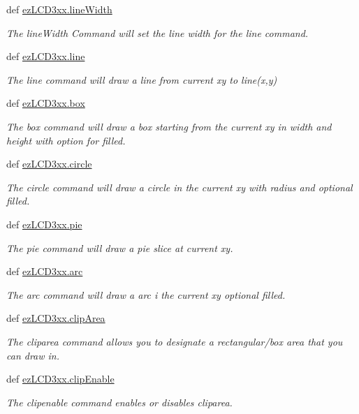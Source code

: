 \begin{DoxyCompactItemize}
def \hyperlink{group___drawing_ga87b2625e7e4ffa927b4471003f8c6e70}{ez\-L\-C\-D3xx.\-line\-Width}
\begin{DoxyCompactList}\small\item\em The line\-Width Command will set the line width for the line command. \end{DoxyCompactList}\item 
def \hyperlink{group___drawing_gae70c22a0a810a70a0dd6d32c9fd7c066}{ez\-L\-C\-D3xx.\-line}
\begin{DoxyCompactList}\small\item\em The line command will draw a line from current xy to line(x,y) \end{DoxyCompactList}\item 
def \hyperlink{group___drawing_ga63bb01e1f5ef0fe2ae2acec0ed90e5bd}{ez\-L\-C\-D3xx.\-box}
\begin{DoxyCompactList}\small\item\em The box command will draw a box starting from the current xy in width and height with option for filled. \end{DoxyCompactList}\item 
def \hyperlink{group___drawing_gabfcfb31f2d88c7397332abcc6b324c7c}{ez\-L\-C\-D3xx.\-circle}
\begin{DoxyCompactList}\small\item\em The circle command will draw a circle in the current xy with radius and optional filled. \end{DoxyCompactList}\item 
def \hyperlink{group___drawing_ga12fb93d2d6f7ce3f08ad988c09624d57}{ez\-L\-C\-D3xx.\-pie}
\begin{DoxyCompactList}\small\item\em The pie command will draw a pie slice at current xy. \end{DoxyCompactList}\item 
def \hyperlink{group___drawing_ga13a0a8fb9c906a687f2a42864d973cc1}{ez\-L\-C\-D3xx.\-arc}
\begin{DoxyCompactList}\small\item\em The arc command will draw a arc i the current xy optional filled. \end{DoxyCompactList}\item 
def \hyperlink{group___drawing_ga2f55674143f1e4b06e42f09aaf0da71c}{ez\-L\-C\-D3xx.\-clip\-Area}
\begin{DoxyCompactList}\small\item\em The cliparea command allows you to designate a rectangular/box area that you can draw in. \end{DoxyCompactList}\item 
def \hyperlink{group___drawing_gabd1433160288289495e6c006e77951e6}{ez\-L\-C\-D3xx.\-clip\-Enable}
\begin{DoxyCompactList}\small\item\em The clipenable command enables or disables cliparea. \end{DoxyCompactList}\end{DoxyCompactItemize}


